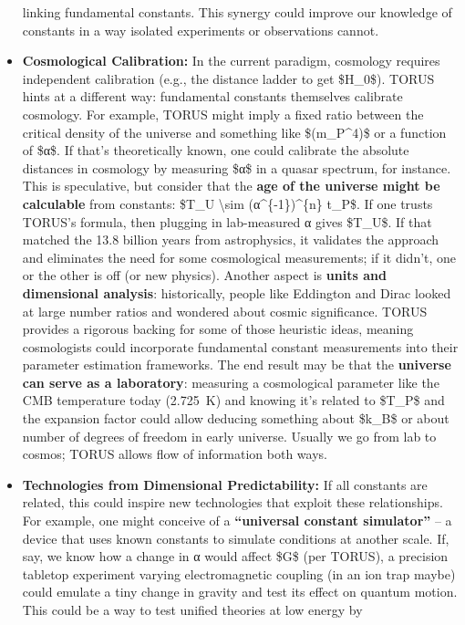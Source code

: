 \documentclass[]{article}
\begin{document}
\begin{itemize}
  linking fundamental constants. This synergy could improve our
  knowledge of constants in a way isolated experiments or observations
  cannot.
\item
  \textbf{Cosmological Calibration:} In the current paradigm, cosmology
  requires independent calibration (e.g., the distance ladder to get
  \$H\_0\$). TORUS hints at a different way: fundamental constants
  themselves calibrate cosmology. For example, TORUS might imply a fixed
  ratio between the critical density of the universe and something like
  \$(m\_P\^{}4)\$ or a function of \$α\$. If that's theoretically known,
  one could calibrate the absolute distances in cosmology by measuring
  \$α\$ in a quasar spectrum, for instance. This is speculative, but
  consider that the \textbf{age of the universe might be calculable}
  from constants: \$T\_U \textbackslash{}sim (α\^{}\{-1\})\^{}\{n\}
  t\_P\$. If one trusts TORUS's formula, then plugging in lab-measured α
  gives \$T\_U\$. If that matched the 13.8 billion years from
  astrophysics, it validates the approach and eliminates the need for
  some cosmological measurements; if it didn't, one or the other is off
  (or new physics). Another aspect is \textbf{units and dimensional
  analysis}: historically, people like Eddington and Dirac looked at
  large number ratios and wondered about cosmic significance. TORUS
  provides a rigorous backing for some of those heuristic ideas, meaning
  cosmologists could incorporate fundamental constant measurements into
  their parameter estimation frameworks. The end result may be that the
  \textbf{universe can serve as a laboratory}: measuring a cosmological
  parameter like the CMB temperature today (2.725~K) and knowing it's
  related to \$T\_P\$ and the expansion factor could allow deducing
  something about \$k\_B\$ or about number of degrees of freedom in
  early universe. Usually we go from lab to cosmos; TORUS allows flow of
  information both ways.
\item
  \textbf{Technologies from Dimensional Predictability:} If all
  constants are related, this could inspire new technologies that
  exploit these relationships. For example, one might conceive of a
  \textbf{``universal constant simulator''} -- a device that uses known
  constants to simulate conditions at another scale. If, say, we know
  how a change in α would affect \$G\$ (per TORUS), a precision tabletop
  experiment varying electromagnetic coupling (in an ion trap maybe)
  could emulate a tiny change in gravity and test its effect on quantum
  motion. This could be a way to test unified theories at low energy by

\end{itemize}
\end{document}
